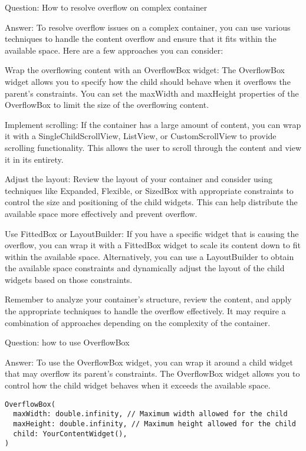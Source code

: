 Question: How to resolve overflow on complex container

Answer: To resolve overflow issues on a complex container, you can use various techniques to handle the content 
overflow and ensure that it fits within the available space. Here are a few approaches you can consider:

Wrap the overflowing content with an OverflowBox widget: The OverflowBox widget allows you to specify how the 
child should behave when it overflows the parent's constraints. You can set the maxWidth and maxHeight properties 
of the OverflowBox to limit the size of the overflowing content.

Implement scrolling: If the container has a large amount of content, you can wrap it with a SingleChildScrollView, 
ListView, or CustomScrollView to provide scrolling functionality. This allows the user to scroll through the content 
and view it in its entirety.

Adjust the layout: Review the layout of your container and consider using techniques like Expanded, Flexible, or 
SizedBox with appropriate constraints to control the size and positioning of the child widgets. This can help 
distribute the available space more effectively and prevent overflow.

Use FittedBox or LayoutBuilder: If you have a specific widget that is causing the overflow, you can wrap it with a 
FittedBox widget to scale its content down to fit within the available space. Alternatively, you can use a 
LayoutBuilder to obtain the available space constraints and dynamically adjust the layout of the child widgets 
based on those constraints.

Remember to analyze your container's structure, review the content, and apply the appropriate techniques to handle 
the overflow effectively. It may require a combination of approaches depending on the complexity of the container.


Question: how to use OverflowBox 

Answer: To use the OverflowBox widget, you can wrap it around a child widget that may overflow its parent's constraints. 
The OverflowBox widget allows you to control how the child widget behaves when it exceeds the available space.

\begin{lstlisting}
OverflowBox(
  maxWidth: double.infinity, // Maximum width allowed for the child
  maxHeight: double.infinity, // Maximum height allowed for the child
  child: YourContentWidget(),
)
\end{lstlisting}

